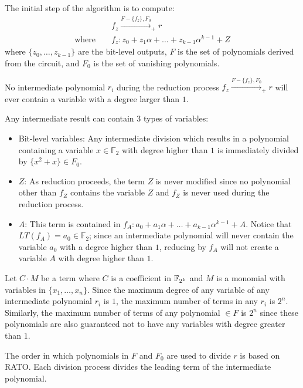The initial step of the algorithm is to compute:
\begin{eqnarray}
& & f_z\xrightarrow{F-\{f_z\},F_0}_+ r \\
\text{where } & & f_z: z_0+z_1\alpha+\dots+z_{k-1}\alpha^{k-1}+Z
\end{eqnarray}
where $\{z_0,\dots,z_{k-1}\}$ are the bit-level outputs, $F$ is the set of polynomials
derived from the circuit, and $F_0$ is the set of vanishing polynomials.

\begin{Lemma}\label{lem:degreeOne}
No intermediate polynomial $r_i$ during the reduction process $f_z\xrightarrow{F-\{f_z\},F_0}_+ r$
will ever contain a variable with a degree larger than $1$.
\end{Lemma}
\begin{Proof}
Any intermediate result can contain $3$ types of variables:
\begin{itemize}
\item Bit-level variables: Any intermediate division which results in a polynomial containing a variable 
      $x\in\mathbb{F}_2$ with degree higher than $1$ is immediately divided by $\{x^2+x\}\in F_0$.
\item $Z$: 
As reduction proceeds,  
the term $Z$ is never modified since no polynomial other than $f_Z$ contains the variable $Z$ and $f_Z$ is 
never used during the reduction process.
\item $A$: This term is contained in $f_A:a_0+a_1\alpha+\dots+a_{k-1}\alpha^{k-1}+A$. 
Notice that $LT(f_A)=a_0\in\mathbb{F}_2$; 
since an intermediate polynomial will never contain the variable $a_0$ with a degree higher than $1$, 
reducing by $f_A$ will not create a variable $A$ with degree higher than $1$.
\end{itemize}
\end{Proof}
 
\begin{Lemma}\label{lem:numTerms}
Let $C\cdot M$ be a term where $C$ is a coefficient in ${\mathbb{F}}_{2^k}$ and $M$ is a monomial
with variables in $\{x_1,\dots,x_n\}$. Since the maximum degree of any variable of 
any intermediate polynomial $r_i$ is $1$,
the maximum number of terms in any $r_i$ is $2^n$.
Similarly, the maximum number of terms of any polynomial $\in F$ is $2^n$ since these
polynomials are also guaranteed not to have any variables with degree greater than $1$.
\end{Lemma}

The order in which polynomials in $F$ and $F_0$ are used to divide $r$ is based on RATO.
Each division process divides the leading term of the intermediate polynomial. 

